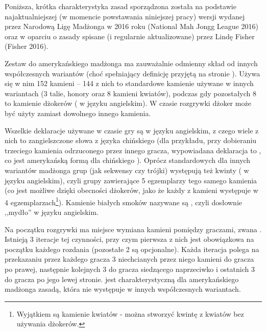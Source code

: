 Poniższa, krótka charakterystyka zasad sporządzona została na podstawie
najaktualniejszej (w momencie powstawania niniejszej pracy) wersji wydanej przez
Narodową Ligę Madżonga w 2016 roku (National Mah Jongg League 2016) oraz w
oparciu o zasady spisane (i regularnie aktualizowane) przez Lindę Fisher
(Fisher 2016).

Zestaw do amerykańskiego madżonga ma zauważalnie odmienny skład od innych
współczesnych wariantów (choć spełniający definicję przyjętą na stronie
\pageref{definicja}). Używa się w nim 152 kamieni -- 144 z nich to standardowe
kamienie używane w innych wariantach (3 talie, honory oraz 8 kamieni kwiatów),
podczas gdy pozostałych 8 to kamienie dżokerów ( w języku
angielskim). W czasie rozgrywki dżoker może być użyty zamiast dowolnego innego
kamienia.

Wszelkie deklaracje używane w czasie gry są w języku angielskim, z czego wiele z
nich to zangielszczone słowa z języka chińskiego (dla przykładu, przy
dobieraniu trzeciego kamienia odrzuconego przez innego gracza, wypowiadana
deklaracja to , co jest amerykańską formą dla chińskiego
). Oprócz standardowych dla innych wariantów madżonga grup (jak
sekwensy czy trójki) występują też kwinty ( w języku
angielskim), czyli grupy zawierające 5 egzemplarzy tego samego kamienia (co
jest możliwe dzięki obecności dżokerów, jako że każdy z kamieni występuje w 4
egzemplarzach\footnote{Wyjątkiem są kamienie kwiatów - można stworzyć kwintę
z kwiatów bez używania dżokerów.}). Kamienie białych smoków nazywane są
, czyli dosłownie ,,mydło'' w języku angielskim.

Na początku rozgrywki ma miejsce wymiana kamieni pomiędzy graczami, zwana
. Istnieją 3 iteracje tej czynności, przy czym pierwsza z
nich jest obowiązkowa na początku każdego rozdania (pozostałe 2 są opcjonalne).
Każda iteracja polega na przekazaniu przez każdego gracza 3 niechcianych przez
niego kamieni do gracza po prawej, następnie kolejnych 3 do gracza siedzącego
naprzeciwko i ostatnich 3 do gracza po jego lewej stronie. 
jest charakterystyczną dla amerykańskiego madżonga zasadą, która nie występuje w
innych współczesnych wariantach.

